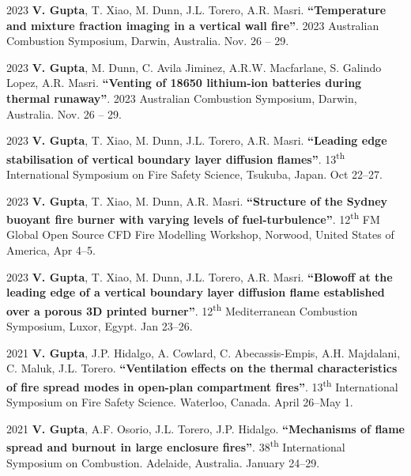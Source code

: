 \documentclass[12pt,letterpaper]{report}
\begin{document}
\begin{tablist}
        \item[2023] \tab \textbf{V. Gupta}, T. Xiao, M. Dunn, J.L. Torero, A.R. Masri. \textbf{\enquote{\textbf{Temperature and mixture fraction imaging in a vertical wall fire}}}. 2023 Australian Combustion Symposium, Darwin, Australia. Nov. 26 -- 29.

        \item[2023] \tab \textbf{V. Gupta}, M. Dunn, C. Avila Jiminez, A.R.W. Macfarlane, S. Galindo Lopez, A.R. Masri. \textbf{\enquote{\textbf{Venting of 18650 lithium-ion batteries during thermal runaway}}}. 2023 Australian Combustion Symposium, Darwin, Australia. Nov. 26 -- 29.

        \item[2023] \tab *\textbf{V. Gupta}, T. Xiao, M. Dunn, J.L. Torero, A.R. Masri. \textbf{\enquote{\textbf{Leading edge stabilisation of vertical boundary layer diffusion flames}}}. 13\textsuperscript{th} International Symposium on Fire Safety Science, Tsukuba, Japan. Oct 22--27.
        
        \item[2023] \tab \textbf{V. Gupta}, T. Xiao, M. Dunn, A.R. Masri. \textbf{\enquote{\textbf{Structure of the Sydney buoyant fire burner with varying levels of fuel-turbulence}}}. 12\textsuperscript{th} FM Global Open Source CFD Fire Modelling Workshop, Norwood, United States of America, Apr 4--5.

        \item[2023] \tab *\textbf{V. Gupta}, T. Xiao, M. Dunn, J.L. Torero, A.R. Masri. \textbf{\enquote{\textbf{Blowoff at the leading edge of a vertical boundary layer diffusion flame established over a porous 3D printed burner}}}. 12\textsuperscript{th} Mediterranean Combustion Symposium, Luxor, Egypt. Jan 23--26.

    	\item[2021] \tab *\textbf{V. Gupta}, J.P. Hidalgo, A. Cowlard, C. Abecassis-Empis, A.H. Majdalani, C. Maluk, J.L. Torero. \textbf{\enquote{Ventilation effects on the thermal characteristics of fire spread modes in open-plan compartment fires}}. 13\textsuperscript{th} International Symposium on Fire Safety Science. Waterloo, Canada. April 26--May 1.
    	
    	\item[2021] \tab *\textbf{V. Gupta}, A.F. Osorio, J.L. Torero, J.P. Hidalgo. \textbf{\enquote{Mechanisms of flame spread and burnout in large enclosure fires}}. 38\textsuperscript{th} International Symposium on Combustion. Adelaide, Australia. January 24--29.
    	

\end{tablist}
\end{document}

